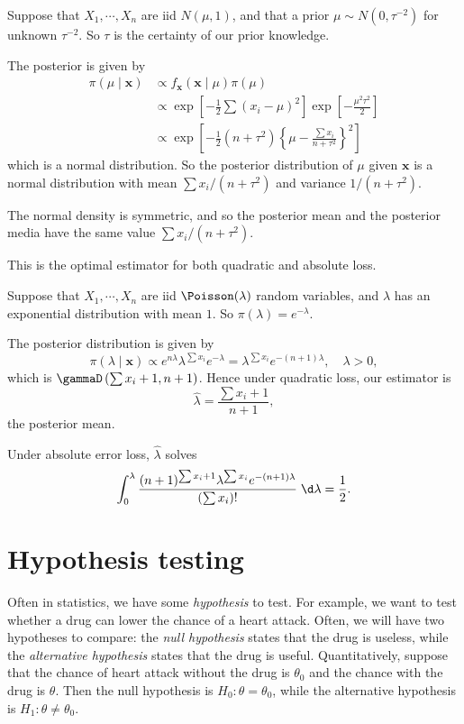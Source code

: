 \documentclass[a4paper]{article}
\begin{document}
\begin{eg}
  Suppose that $X_1, \cdots , X_n$ are iid $N(\mu, 1)$, and that a prior $\mu\sim N(0, \tau^{-2})$ for unknown $\tau^{-2}$. So $\tau$ is the certainty of our prior knowledge.

  The posterior is given by
  \begin{align*}
    \pi(\mu\mid \mathbf{x})&\propto f_\mathbf{x}(\mathbf{x}\mid \mu)\pi(\mu)\\
    &\propto \exp\left[-\frac{1}{2}\sum(x_i - \mu)^2\right]\exp\left[-\frac{\mu^2\tau^2}{2}\right]\\
    &\propto \exp\left[-\frac{1}{2}(n + \tau^2)\left\{\mu - \frac{\sum x_i}{n + \tau^2}\right\}^2\right]
  \end{align*}
  which is a normal distribution. So the posterior distribution of $\mu$ given $\mathbf{x}$ is a normal distribution with mean $\sum x_i/(n + \tau^2)$ and variance $1/(n + \tau^2)$.

  The normal density is symmetric, and so the posterior mean and the posterior media have the same value $\sum x_i/(n + \tau^2)$.

  This is the optimal estimator for both quadratic and absolute loss.
\end{eg}

\begin{eg}
  Suppose that $X_1, \cdots, X_n$ are iid $\Poisson(\lambda)$ random variables, and $\lambda$ has an exponential distribution with mean $1$. So $\pi(\lambda) = e^{-\lambda}.$

  The posterior distribution is given by
  \[
    \pi(\lambda\mid \mathbf{x}) \propto e^{n\lambda} \lambda^{\sum x_i}e^{-\lambda} = \lambda^{\sum x_i}e^{-(n + 1)\lambda},\quad \lambda > 0,
  \]
  which is $\gammaD\left(\sum x_i + 1, n + 1\right)$. Hence under quadratic loss, our estimator is
  \[
    \hat{\lambda} = \frac{\sum x_i + 1}{n + 1},
  \]
  the posterior mean.

  Under absolute error loss, $\hat{\lambda}$ solves
  \[
    \int_0^{\lambda} \frac{(n + 1)^{\sum x_i + 1}\lambda^{\sum x_i}e ^{-(n + 1)\lambda}}{(\sum x_i)!}\;\d \lambda = \frac{1}{2}.
  \]
\end{eg}

\section{Hypothesis testing}
Often in statistics, we have some \emph{hypothesis} to test. For example, we want to test whether a drug can lower the chance of a heart attack. Often, we will have two hypotheses to compare: the \emph{null hypothesis} states that the drug is useless, while the \emph{alternative hypothesis} states that the drug is useful. Quantitatively, suppose that the chance of heart attack without the drug is $\theta_0$ and the chance with the drug is $\theta$. Then the null hypothesis is $H_0: \theta = \theta_0$, while the alternative hypothesis is $H_1: \theta \not= \theta_0$.
\end{document}
